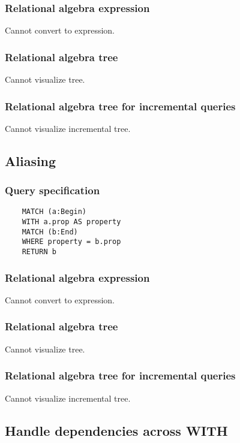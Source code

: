 	\subsubsection*{Relational algebra expression}

	Cannot convert to expression.

	\subsubsection*{Relational algebra tree}

	Cannot visualize tree.

	\subsubsection*{Relational algebra tree for incremental queries}

	Cannot visualize incremental tree.
	\subsection{Aliasing}

	\subsubsection*{Query specification}

	\begin{lstlisting}
	MATCH (a:Begin)
	WITH a.prop AS property
	MATCH (b:End)
	WHERE property = b.prop
	RETURN b
	\end{lstlisting}


	\subsubsection*{Relational algebra expression}

	Cannot convert to expression.

	\subsubsection*{Relational algebra tree}

	Cannot visualize tree.

	\subsubsection*{Relational algebra tree for incremental queries}

	Cannot visualize incremental tree.
	\subsection{Handle dependencies across WITH}

